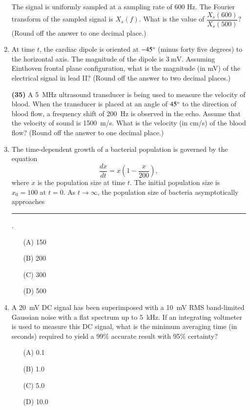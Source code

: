 \documentclass[journal]{IEEEtran}
\begin{document}
\begin{enumerate}
The signal is uniformly sampled at a sampling rate of 600 Hz. The Fourier transform of the sampled signal is \( X_s(f) \). What is the value of \( \dfrac{X_s(600)}{X_s(500)} \)? (Round off the answer to one decimal place.)
\hfill{}

\item  At time \( t \), the cardiac dipole is oriented at \(-45\degree\) (minus forty five degrees) to the horizontal axis. The magnitude of the dipole is \(3\ \text{mV}\). Assuming Einthoven frontal plane configuration, what is the magnitude (in mV) of the electrical signal in lead II? (Round off the answer to two decimal places.)
\hfill{}

\textbf{(35)} A 5~MHz ultrasound transducer is being used to measure the velocity of blood. When the transducer is placed at an angle of \( 45\degree \) to the direction of blood flow, a frequency shift of 200~Hz is observed in the echo. Assume that the velocity of sound is 1500~m/s. What is the velocity (in cm/s) of the blood flow? (Round off the answer to one decimal place.)

\hfill{}

\item  The time-dependent growth of a bacterial population is governed by the equation
\[
\frac{dx}{dt} = x \left(1 - \frac{x}{200} \right),
\]
where \( x \) is the population size at time \( t \). The initial population size is \( x_0 = 100 \) at \( t = 0 \). As \( t \to \infty \), the population size of bacteria asymptotically approaches \rule{4cm}{0.15mm}.

\begin{enumerate}
    \item[(A)] 150
    \item[(B)] 200
    \item[(C)] 300
    \item[(D)] 500
\end{enumerate}
\hfill{}

\item  
A \SI{20}{\milli\volt} DC signal has been superimposed with a \SI{10}{\milli\volt} RMS band-limited Gaussian noise with a flat spectrum up to \SI{5}{\kilo\hertz}. If an integrating voltmeter is used to measure this DC signal, what is the minimum averaging time (in seconds) required to yield a 99\% accurate result with 95\% certainty?

\begin{itemize}
  \item[(A)] 0.1
  \item[(B)] 1.0
  \item[(C)] 5.0
  \item[(D)] 10.0
\end{itemize}
\hfill{}


\end{enumerate}
\end{document}
